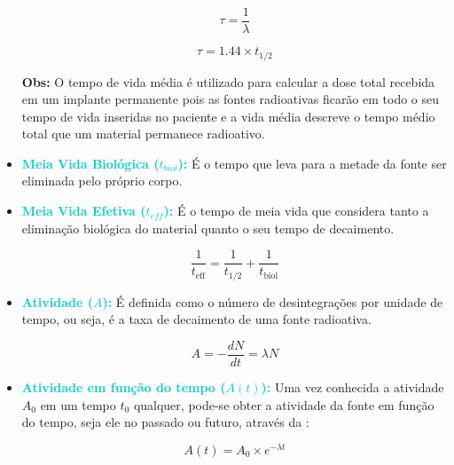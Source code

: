\documentclass[11pt,a4paper]{article}
\begin{document}
\begin{itemize}
				\begin{equation}
					\tau = \frac{1}{\lambda}
				\end{equation}

				\begin{equation}
					\tau = 1.44 \times t_{1/2}
				\end{equation}

				\textbf{\textcolor{CarnationPink}{Obs:}} O tempo de vida média é utilizado para calcular a dose total recebida em um implante permanente pois as fontes radioativas ficarão em todo o seu tempo de vida inseridas no paciente e a vida média descreve o tempo médio total que um material permanece radioativo.

			\item \textcolor{DarkTurquoise}{\textbf{Meia Vida Biológica ($t_{biol}$):}} É o tempo que leva para a metade da fonte ser eliminada pelo próprio corpo.
			
			\item \textcolor{DarkTurquoise}{\textbf{Meia Vida Efetiva ($t_{eff}$):}} É o tempo de meia vida que considera tanto a eliminação biológica do material quanto o seu tempo de decaimento.
			
				\begin{equation}
					\frac{1}{t_{\text{eff}}} = \frac{1}{t_{1/2}} + \frac{1}{t_{\text{biol}}}
				\end{equation}

			\item \textcolor{DarkTurquoise}{\textbf{Atividade ($A$):}} É definida como o número de desintegrações por unidade de tempo, ou seja, é a taxa de decaimento de uma fonte radioativa. 
				
				\begin{equation}
					A = -\frac{dN}{dt} = \lambda N
				\end{equation}

			\item \textcolor{DarkTurquoise}{\textbf{Atividade em função do tempo ($A(t)$):}} Uma vez conhecida a atividade $A_0$ em um tempo $t_0$ qualquer, pode-se obter a atividade da fonte em função do tempo, seja ele no passado ou futuro, através da  :
				
				\begin{equation}
					A(t) = A_0 \times e^{-\lambda t}
					\label{eq:AtividadeNoTempo}
				\end{equation}


\end{itemize}
\end{document}
